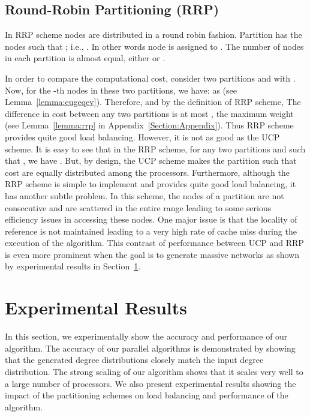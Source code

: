 \documentclass[conference,letterpaper,10pt]{IEEEtran}
\begin{document}
\subsection{Round-Robin Partitioning (RRP)}
\label{Section:PCL:RRP}
In RRP scheme nodes are distributed in a round robin fashion.  Partition  has the nodes  such that ; i.e., . In other words node  is assigned to . The number of nodes in each partition is almost equal, either  or . 

In order to compare the computational cost, consider two partitions  and  with . Now, for the -th nodes in these two partitions,  we have:    as  (see Lemma~\ref{lemma:eugeqev}). Therefore,  and by the definition of RRP scheme,  The difference in cost between any two partitions is at most , the maximum weight (see Lemma~\ref{lemma:rrp} in Appendix~\ref{Section:Appendix}). Thus RRP scheme provides quite good load balancing. However, it is not as good as the UCP scheme. It is easy to see that in the RRP scheme, for any two partitions  and  such that , we have . But, by design, the UCP scheme makes the partition such that cost are equally distributed among the processors. 
Furthermore, although the RRP scheme is simple to implement and provides quite good load balancing, it has another subtle problem. In this scheme, the nodes of a partition are not consecutive and are scattered in the entire range leading to some serious efficiency issues in accessing these nodes. One major issue is that the locality of reference is not maintained leading to a very high rate of cache miss during the execution of the algorithm. This contrast of performance between UCP and RRP is even more prominent when the goal is to generate massive networks as shown by experimental results in Section~\ref{Section:PCL:exp}.



\section{Experimental Results}
\label{Section:PCL:exp}
In this section, we experimentally show the accuracy and performance of our algorithm. The accuracy of our parallel algorithms is demonstrated by showing that the generated degree distributions closely match the input degree distribution. The strong scaling of our algorithm shows that it scales very well to a large number of processors. We also present experimental results showing the impact of the partitioning schemes on load balancing and performance of the algorithm.
\end{document}
